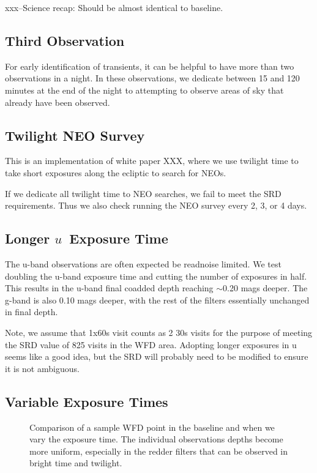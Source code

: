 xxx--Science recap: Should be almost identical to baseline. 

\subsection{Third Observation}

For early identification of transients, it can be helpful to have more than two observations in a night. In these observations, we dedicate between 15 and 120 minutes at the end of the night to attempting to observe areas of sky that already have been observed.

\subsection{Twilight NEO Survey}

This is an implementation of white paper XXX, where we use twilight time to take short exposures along the ecliptic to search for NEOs. 

If we dedicate all twilight time to NEO searches, we fail to meet the SRD requirements. Thus we also check running the NEO survey every 2, 3, or 4 days.

\subsection{Longer $u$\ Exposure Time}\label{ss:u60}

The u-band observations are often expected be readnoise limited. We test doubling the u-band exposure time and cutting the number of exposures in half. This results in the u-band final coadded depth reaching $\sim$0.20 mags deeper. The g-band is also 0.10 mags deeper, with the rest of the filters essentially unchanged in final depth.

Note, we assume that 1x60s visit counts as 2 30s visits for the purpose of meeting the SRD value of 825 visits in the WFD area. Adopting longer exposures in u seems like a good idea, but the SRD will probably need to be modified to ensure it is not ambiguous.

\subsection{Variable Exposure Times}

\begin{figure}
\caption{Comparison of a sample WFD point in the baseline and when we vary the exposure time. The individual observations depths become more uniform, especially in the redder filters that can be observed in bright time and twilight.}\label{fig:varexptime}
\end{figure}

